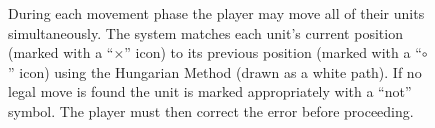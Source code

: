 \documentclass[10pt,twocolumn,letterpaper]{article}
\begin{document}
\begin{figure}[t]
%
\caption{During each movement phase the player may move all of their
  units simultaneously.  The system matches each unit's current
  position (marked with a ``$\times$'' icon) to its previous position
  (marked with a ``$\circ$'' icon) using the Hungarian Method (drawn
  as a white path).  If no legal move is found the unit is marked
  appropriately with a ``not'' symbol.  The player must then correct the
  error before proceeding.  }
\vspace{-0.15in}
\label{FIGURE:MovementSequence}
\end{figure}
\end{document}
